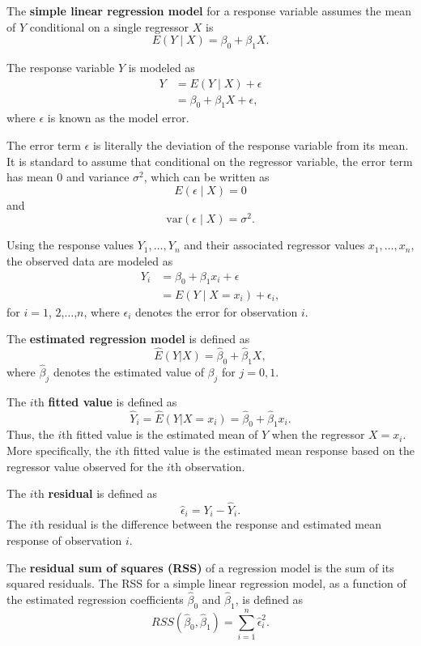 \documentclass[
]{book}
\theoremstyle{definition}
\theoremstyle{definition}
\theoremstyle{definition}
\theoremstyle{definition}
\theoremstyle{remark}
\begin{document}
The \textbf{simple linear regression model} for a response variable assumes the mean of \(Y\) conditional on a single regressor \(X\) is
\[
E(Y\mid X) = \beta_0 + \beta_1 X.
\]

The response variable \(Y\) is modeled as
\[
\begin{aligned}
Y &= E(Y \mid X) + \epsilon \\
&= \beta_0 + \beta_1 X + \epsilon,
\end{aligned}
\label{eq:slr-model-Y}
\]
where \(\epsilon\) is known as the model error.

The error term \(\epsilon\) is literally the deviation of the response variable from its mean.
It is standard to assume that conditional on the regressor variable, the error term has mean 0 and variance \(\sigma^2\), which can be written as
\[
E(\epsilon \mid X) = 0 \label{eq:error-mean}
\]
and
\[
\mathrm{var}(\epsilon \mid X) = \sigma^2.\label{eq:error-var}
\]

Using the response values \(Y_1, \ldots, Y_n\) and their associated regressor values \(x_1, \ldots, x_n\), the observed data are modeled as
\[
\begin{aligned}
Y_i &= \beta_0 + \beta_1 x_i + \epsilon \\
&= E(Y\mid X = x_i) + \epsilon_i,
\end{aligned}
\]
for \(i=1\), \(2\),\(\ldots\),\(n\), where \(\epsilon_i\) denotes the error for observation \(i\).

The \textbf{estimated regression model} is defined as
\[\hat{E}(Y|X) = \hat{\beta}_0 + \hat{\beta}_1 X,\]
where \(\hat{\beta}_j\) denotes the estimated value of \(\beta_j\) for \(j=0,1\).

The \(i\)th \textbf{fitted value} is defined as
\[
\hat{Y}_i = \hat{E}(Y|X = x_i) = \hat{\beta}_0 + \hat{\beta}_1 x_i. \label{eq:def-fitted-value-slr}
\]
Thus, the \(i\)th fitted value is the estimated mean of \(Y\) when the regressor \(X=x_i\). More specifically, the \(i\)th fitted value is the estimated mean response based on the regressor value observed for the \(i\)th observation.

The \(i\)th \textbf{residual} is defined as
\[
\hat{\epsilon}_i = Y_i - \hat{Y}_i. \label{eq:def-residual-slr}
\]
The \(i\)th residual is the difference between the response and estimated
mean response of observation \(i\).

The \textbf{residual sum of squares (RSS)} of a regression model is the sum of its squared residuals. The RSS for a simple linear regression model, as a function of the estimated regression coefficients \(\hat{\beta}_0\) and \(\hat{\beta}_1\), is defined as
\[
RSS(\hat{\beta}_0, \hat{\beta}_1) = \sum_{i=1}^n \hat{\epsilon}_i^2. \label{eq:def-rss-slr}
\]
\end{document}
